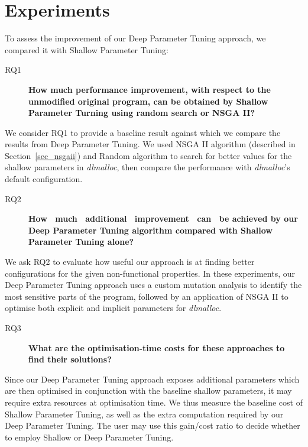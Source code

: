 
\section{Experiments}

To assess the improvement of our Deep Parameter Tuning approach, we compared it with Shallow Parameter Tuning: 
 

\begin{description}
 \item[RQ1] {\bf How much performance improvement, with respect to the unmodified original program, can be obtained by Shallow Parameter Turning using random search or NSGA II? }
\end{description}

We consider RQ1 to provide a baseline result against which we compare the results from Deep Parameter Tuning.
We used NSGA II algorithm (described in Section~\ref{sec_nsgaii}) and Random algorithm to search for better values for the shallow parameters in \emph{dlmalloc}, then compare the performance with \emph{dlmalloc}'s default configuration. 

\begin{description}
\item[RQ2] {\bf How ~much ~additional ~improvement ~can ~be achieved by our Deep Parameter Tuning algorithm compared with Shallow Parameter Tuning alone? }
\end{description}

We ask RQ2 to evaluate how useful our approach is at finding better configurations for the given non-functional properties. 
In these experiments, our Deep Parameter Tuning approach uses a custom mutation analysis to identify the most sensitive parts of the program, 
followed by an application of NSGA II to optimise both explicit and implicit parameters for \emph{dlmalloc}. 

\begin{description}
\item[RQ3] {\bf What are the optimisation-time costs for these approaches to find their solutions? }
\end{description} 

Since our Deep Parameter Tuning approach exposes additional parameters
which are then optimised in conjunction with the baseline shallow
parameters, it may require extra resources at optimisation time.  
We thus measure the baseline cost of Shallow Parameter Tuning, as
well as the extra computation required by our Deep Parameter
Tuning. The user may use this gain/cost ratio to
decide whether to employ Shallow or Deep Parameter Tuning.


